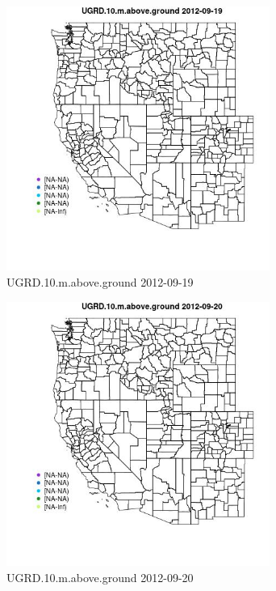 \begin{figure} 
\centering  
\includegraphics[width=0.77\textwidth]{Code_Outputs/ML_input_report_ML_input_PM25_Step5_part_d_de_duplicated_aves_ML_input_MapObsUGRD10maboveground2012-09-19.jpg} 
\caption{\label{fig:ML_input_report_ML_input_PM25_Step5_part_d_de_duplicated_aves_ML_inputMapObsUGRD10maboveground2012-09-19}UGRD.10.m.above.ground 2012-09-19} 
\end{figure} 
 

\begin{figure} 
\centering  
\includegraphics[width=0.77\textwidth]{Code_Outputs/ML_input_report_ML_input_PM25_Step5_part_d_de_duplicated_aves_ML_input_MapObsUGRD10maboveground2012-09-20.jpg} 
\caption{\label{fig:ML_input_report_ML_input_PM25_Step5_part_d_de_duplicated_aves_ML_inputMapObsUGRD10maboveground2012-09-20}UGRD.10.m.above.ground 2012-09-20} 
\end{figure} 
 

